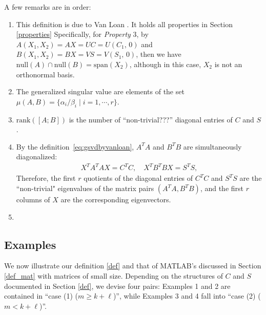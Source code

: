 \bigskip 
\noindent A few remarks are in order: 
\begin{enumerate} 
\item This definition is due to Van Loan \cite{van1976generalizing}. 
It holds all properties in Section \ref{properties} 
Specifically, for \textit{Property} 3, by 
$A(X_1, X_2) = AX = UC = U(C_1, \, 0)$ and 
$B(X_1, X_2) = BX = VS = V(S_1, \, 0)$, then we have
$\mbox{null}(A)\cap \mbox{null}(B) = \mbox{span}(X_2)$, 
although in this case, $X_2$ is not an orthonormal basis.
            
\item The generalized singular value are elements of the 
set $\mu(A,B) = \{\alpha_i/\beta_i \mid i=1, \cdots, r\}$. 
            
\item $\mbox{rank}([A; B])$ is the number of ``non-trivial???'' diagonal 
      entries of $C$ and $S$.
            
\item By the definition~\eqref{eq:gsvdbyvanloan}, $A^TA$ and $B^T B$
are simultaneously diagonalized: 
\begin{align*}
X^TA^TAX = C^TC, \quad 
X^TB^TBX = S^TS,
\end{align*}
Therefore, the first $r$ quotients of the diagonal entries 
of $C^TC$ and $S^TS$ are the ``non-trivial" eigenvalues of 
the matrix pairs $(A^TA, B^T B)$, and the first $r$ columns 
of $X$ are the corresponding eigenvectors.

\item {}
\end{enumerate} 


\newpage 
\subsection{Examples}
We now illustrate our definition \ref{def} and that of MATLAB's discussed 
in Section \ref{def_mat} with matrices of small size. Depending on the structures of $C$ 
and $S$ documented in Section \ref{def}, we devise four pairs: 
Examples 1 and 2 are contained in ``case (1) ($m \geq k+\ell$)'',
while Examples 3 and 4 fall into ``case (2) ($m < k+\ell$)''.   

